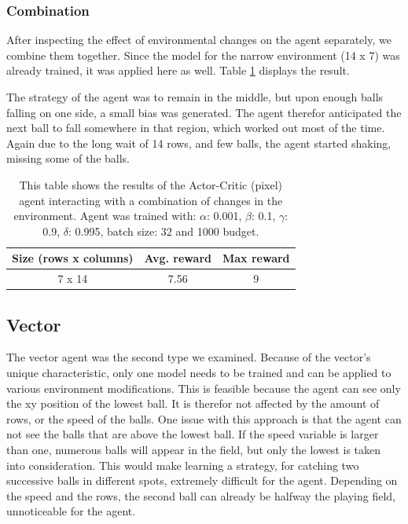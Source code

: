 \documentclass{article}
\begin{document}
\subsubsection{Combination}
After inspecting the effect of environmental changes on the agent separately, we combine them together. 
Since the model for the narrow environment (14 x 7) was already trained, it was applied here as well. 
Table \ref{tab:Pixel-comb} displays the result.

The strategy of the agent was to remain in the middle, but upon enough balls falling on one side, a small bias was generated. 
The agent therefor anticipated the next ball to fall somewhere in that region, which worked out most of the time.
Again due to the long wait of 14 rows, and few balls, the agent started shaking, missing some of the balls. 

\begin{table}[]
    \centering
    \begin{tabular}{|c|c|c|}
        \hline
        \textbf{Size (rows x columns)} & \textbf{Avg. reward} & \textbf{Max reward} \\
        \hline
        7 x 14                & 7.56        & 9    \\
        \hline              
    \end{tabular}
    \caption{This table shows the results of the Actor-Critic (pixel) agent interacting with a combination of changes in the environment. 
    Agent was trained with: $\alpha$: 0.001, $\beta$: 0.1, $\gamma$: 0.9, $\delta$: 0.995, batch size: 32 and 1000 budget. }
    \label{tab:Pixel-comb}
\end{table}


\subsection{Vector}
\label{ENV-vars}
The vector agent was the second type we examined.
Because of the vector's unique characteristic, only one model needs to be trained and can be applied to various environment modifications.
This is feasible because the agent can see only the xy position of the lowest ball. 
It is therefor not affected by the amount of rows, or the speed of the balls.
One issue with this approach is that the agent can not see the balls that are above the lowest ball.
If the speed variable is larger than one, numerous balls will appear in the field, but only the lowest is taken into consideration.
This would make learning a strategy, for catching two successive balls in different spots, extremely difficult for the agent. 
Depending on the speed and the rows, the second ball can already be halfway the playing field, unnoticeable for the agent. 
\end{document}
